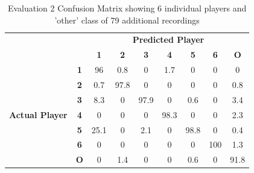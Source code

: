 \documentclass{article}
\begin{document}
{{{\begin{table}[t!]
\begin{minipage}{0.6\linewidth}
\begin{tabular}{cc|c|c|c|c|c|c|c|}
\cline{3-9}
\multicolumn{1}{l}{}                                          & \multicolumn{1}{l|}{} & \multicolumn{7}{c|}{\textbf{Predicted Player}}                                               \\ \cline{3-9} 
\multicolumn{1}{l}{}                                          & \multicolumn{1}{l|}{} & \textbf{1} & \textbf{2} & \textbf{3} & \textbf{4} & \textbf{5} & \textbf{6} & \textbf{O} \\ \hline
\multicolumn{1}{|c|}{\multirow{7}{*}{\begin{turn}{90}\textbf{Actual Player}\end{turn}}} & \textbf{1}            & 96     & 0.8     & 0          & 1.7     & 0          & 0          & 0              \\ \cline{2-9} 
\multicolumn{1}{|c|}{}                                        & \textbf{2}            & 0.7     & 97.8     & 0          & 0          & 0          & 0          & 0.8         \\ \cline{2-9} 
\multicolumn{1}{|c|}{}                                        & \textbf{3}            & 8.3      & 0          & 97.9     & 0          & 0.6     & 0          & 3.4        \\ \cline{2-9} 
\multicolumn{1}{|c|}{}                                        & \textbf{4}            & 0          & 0          & 0          & 98.3     & 0          & 0          & 2.3         \\ \cline{2-9} 
\multicolumn{1}{|c|}{}                                        & \textbf{5}            & 25.1      & 0          & 2.1     & 0          & 98.8     & 0          & 0.4         \\ \cline{2-9} 
\multicolumn{1}{|c|}{}                                        & \textbf{6}            & 0          & 0          & 0          & 0          & 0          & 100     & 1.3         \\ \cline{2-9} 
\multicolumn{1}{|c|}{}                                        & \textbf{O}        & 0          & 1.4     & 0          & 0          & 0.6     & 0          & 91.8         \\ \hline
\end{tabular}%

\caption{Evaluation 2 Confusion Matrix showing 6 individual players and 'other' class of 79 additional recordings}

\end{minipage}
\end{table}

}}}
\end{document}
